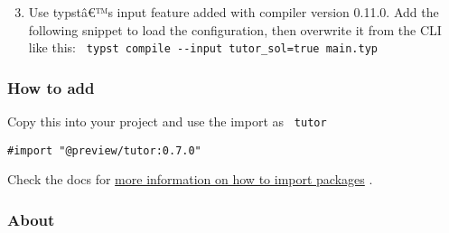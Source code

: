 \begin{Shaded}
\begin{Highlighting}[]
\end{Highlighting}
\end{Shaded}

\begin{enumerate}
\setcounter{enumi}{2}
\tightlist
\item
  Use typstâ€™s input feature added with compiler version 0.11.0. Add
  the following snippet to load the configuration, then overwrite it
  from the CLI like this:
  \texttt{\ typst\ compile\ -\/-input\ tutor\_sol=true\ main.typ\ }
\end{enumerate}

\begin{Shaded}
\begin{Highlighting}[]

\NormalTok{\}}
\end{Highlighting}
\end{Shaded}

\subsubsection{How to add}\label{how-to-add}

Copy this into your project and use the import as \texttt{\ tutor\ }

\begin{verbatim}
#import "@preview/tutor:0.7.0"
\end{verbatim}



Check the docs for
\href{https://typst.app/docs/reference/scripting/\#packages}{more
information on how to import packages} .

\subsubsection{About}\label{about}

